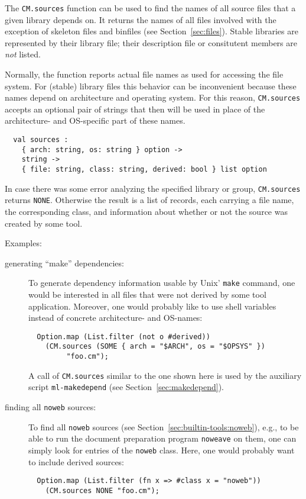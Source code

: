 \documentclass[titlepage,letterpaper]{article}
\begin{document}
The {\tt CM.sources} function can be used to find the names of all
source files that a given library depends on.  It returns the names of
all files involved with the exception of skeleton files and binfiles
(see Section~\ref{sec:files}).  Stable libraries are represented by
their library file; their description file or consitutent members are
{\em not} listed.

Normally, the function reports actual file names as used for accessing
the file system.  For (stable) library files this behavior can be
inconvenient because these names depend on architecture and operating
system.  For this reason, {\tt CM.sources} accepts an optional pair of
strings that then will be used in place of the architecture- and
OS-specific part of these names.

\begin{verbatim}
  val sources :
    { arch: string, os: string } option ->
    string ->
    { file: string, class: string, derived: bool } list option
\end{verbatim}

In case there was some error analyzing the specified library or group,
{\tt CM.sources} returns {\tt NONE}.  Otherwise the result is a list
of records, each carrying a file name, the corresponding class, and
information about whether or not the source was created by some tool.

Examples:

\begin{description}
\item[generating ``make'' dependencies:]
To generate dependency information usable by Unix' {\tt make} command,
one would be interested in all files that were not derived by some
tool application.  Moreover, one would probably like to use shell
variables instead of concrete architecture- and OS-names:
\begin{verbatim}
  Option.map (List.filter (not o #derived))
    (CM.sources (SOME { arch = "$ARCH", os = "$OPSYS" })
         "foo.cm");
\end{verbatim}
A call of {\tt CM.sources} similar to the one shown here is used by
the auxiliary script {\tt ml-makedepend} (see
Section~\ref{sec:makedepend}).
\item[finding all {\tt noweb} sources:]
To find all {\tt noweb} sources (see Section~\ref{sec:builtin-tools:noweb}),
e.g., to be able to run the document preparation program {\tt noweave}
on them, one can simply look for entries of the {\tt noweb} class.
Here, one would probably want to include derived sources:
\begin{verbatim}
  Option.map (List.filter (fn x => #class x = "noweb"))
    (CM.sources NONE "foo.cm");
\end{verbatim}
\end{description}
\end{document}

